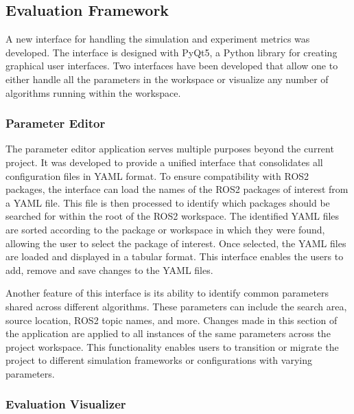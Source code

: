 \documentclass[../report.tex]{subfiles}
\begin{document}

    \subsection{Evaluation Framework}

    A new interface for handling the simulation and experiment metrics was developed. The interface is designed with PyQt5, a Python library for creating graphical user interfaces. 
    Two interfaces have been developed that allow one to either handle all the parameters in the workspace or visualize any number of algorithms running within the workspace.
        
    \subsubsection{Parameter Editor}
    The parameter editor application serves multiple purposes beyond the current project. It was developed to provide a unified interface that consolidates all configuration files in YAML format. 
    To ensure compatibility with ROS2 packages, the interface can load the names of the ROS2 packages of interest from a YAML file. This file is then processed to identify which packages should be
     searched for within the root of the ROS2 workspace. The identified YAML files are sorted according to the package or workspace in which they were found, allowing the user to select the 
     package of interest. Once selected, the YAML files are loaded and displayed in a tabular format. This interface enables the users to add, remove and save changes to the YAML files.  

    Another feature of this interface is its ability to identify common parameters shared across different algorithms. These parameters can include the search area, source location, ROS2 
    topic names, and more. Changes made in this section of the application are applied to all instances of the same parameters across the project workspace. This functionality enables users 
    to transition or migrate the project to different simulation frameworks or configurations with varying parameters.

    \subsubsection{Evaluation Visualizer}
\end{document}
